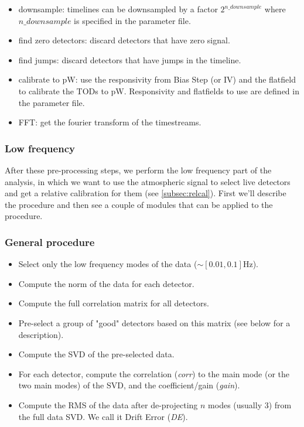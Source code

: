\documentclass[a4paper, 11pt]{article}
\begin{document}
\begin{itemize}
	\item downsample: timelines can be downsampled by a {}factor $2^{n\_downsample}$ where $n\_downsample$ is specified in the parameter file.
	\item find zero detectors: discard detectors that have zero signal.
	\item find jumps: discard detectors that have jumps in the timeline.
	\item calibrate to pW: use the responsivity from Bias Step (or IV) and the flatfield to calibrate the TODs to pW. Responsivity and flatfields to use are defined in the parameter file.
	\item FFT: get the fourier transform of the timestreams.
\end{itemize}

\subsubsection{Low frequency}
\label{subsubsection:lfcuts}
After these pre-processing steps, we perform the low frequency part of the analysis, in which we want to use the atmospheric signal to select live detectors and get a relative calibration for them (see \ref{subsec:relcal}). First we'll describe the procedure and then see a couple of modules that can be applied to the procedure.

\subsubsection*{General procedure}
\begin{itemize}
	\item Select only the low frequency modes of the data ($\sim [0.01,0.1]$Hz).
	\item Compute the norm of the data for each detector.
	\item Compute the full correlation matrix for all detectors.
	\item Pre-select a group of "good" detectors based on this matrix (see below for a description).
	\item Compute the SVD of the pre-selected data.
	\item For each detector, compute the correlation (\emph{corr}) to the main mode (or the two main modes) of the SVD, and the coefficient/gain (\emph{gain}).
	\item Compute the RMS of the data after de-projecting $n$ modes (usually 3) from the full data SVD. We call it Drift Error (\emph{DE}).
\end{itemize}
\end{document}
